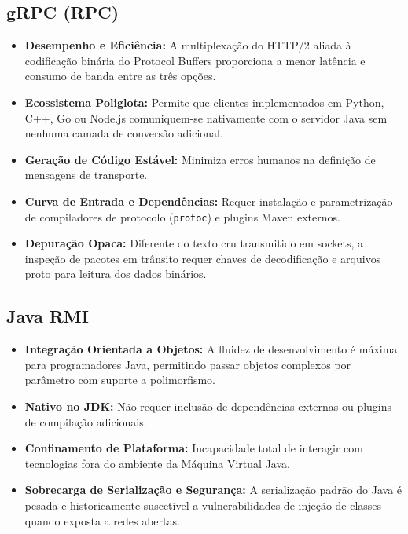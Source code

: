 \documentclass[12pt, a4paper]{article}
\begin{document}
\subsection{gRPC (RPC)}
\begin{itemize}[label=\textcolor{green!60!black}{\textbf{+}}]
    \item \textbf{Desempenho e Eficiência:} A multiplexação do HTTP/2 aliada à codificação binária do Protocol Buffers proporciona a menor latência e consumo de banda entre as três opções.
    \item \textbf{Ecossistema Poliglota:} Permite que clientes implementados em Python, C++, Go ou Node.js comuniquem-se nativamente com o servidor Java sem nenhuma camada de conversão adicional.
    \item \textbf{Geração de Código Estável:} Minimiza erros humanos na definição de mensagens de transporte.
\end{itemize}
\begin{itemize}[label=\textcolor{red!80!black}{\textbf{--}}]
    \item \textbf{Curva de Entrada e Dependências:} Requer instalação e parametrização de compiladores de protocolo (\texttt{protoc}) e plugins Maven externos.
    \item \textbf{Depuração Opaca:} Diferente do texto cru transmitido em sockets, a inspeção de pacotes em trânsito requer chaves de decodificação e arquivos proto para leitura dos dados binários.
\end{itemize}

\subsection{Java RMI}
\begin{itemize}[label=\textcolor{green!60!black}{\textbf{+}}]
    \item \textbf{Integração Orientada a Objetos:} A fluidez de desenvolvimento é máxima para programadores Java, permitindo passar objetos complexos por parâmetro com suporte a polimorfismo.
    \item \textbf{Nativo no JDK:} Não requer inclusão de dependências externas ou plugins de compilação adicionais.
\end{itemize}
\begin{itemize}[label=\textcolor{red!80!black}{\textbf{--}}]
    \item \textbf{Confinamento de Plataforma:} Incapacidade total de interagir com tecnologias fora do ambiente da Máquina Virtual Java.
    \item \textbf{Sobrecarga de Serialização e Segurança:} A serialização padrão do Java é pesada e historicamente suscetível a vulnerabilidades de injeção de classes quando exposta a redes abertas.
\end{itemize}
\end{document}
